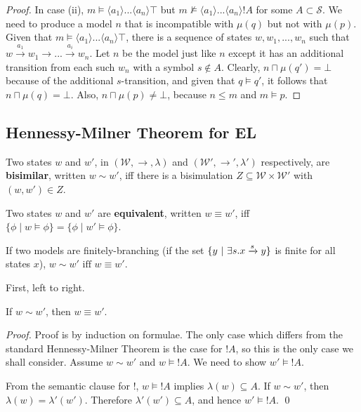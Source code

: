 \begin{proof}
In case (ii), $m \models \langle a_1 \rangle ... \langle a_n \rangle \top$ but $m \nvDash \langle a_1 \rangle ... \langle a_n \rangle !A$ for some $A \subset \mathcal{S}$. We need to produce a model $n$ that is incompatible with $\mu(q)$ but not with $\mu(p)$. Given that $m \models \langle a_1 \rangle ... \langle a_n \rangle \top$, there is a sequence of states $w, w_1, ..., w_n$ such that $w \xrightarrow{a_1} w_1 \rightarrow ... \xrightarrow{a_i} w_n$. Let $n$ be the model just like $n$ except it has an additional transition from each such $w_n$ with a symbol $s \notin A$. Clearly, $n \sqcap \mu(q') = \bot$ because of the additional $s$-transition, and given that $q \models q'$, it follows that $n \sqcap \mu(q) = \bot$. Also, $n \sqcap \mu(p) \neq \bot$, because $n \leq m$ and $m \models p$.


\end{proof}

\subsection{Hennessy-Milner Theorem for EL}

\begin{definition}
Two states $w$ and $w'$, in $(\mathcal{W}, \rightarrow, \lambda)$ and $(\mathcal{W}', \rightarrow', \lambda')$ respectively, are {\bf bisimilar}, written $w \sim w'$, iff there is a bisimulation $Z \subseteq  \mathcal{W} \times \mathcal{W}'$ with $(w,w') \in Z$.
\end{definition}

\begin{definition}
Two states $w$ and $w'$ are {\bf equivalent}, written $w \equiv w'$, iff $\{\phi \; | \; w \models \phi\} = \{\phi \; | \; w' \models \phi\}$.
\end{definition}
\begin{theorem}
If two models are finitely-branching (if the set $\{y \ | \  \exists s . x \xrightarrow{s} y\}$ is finite for all states $x$), $w \sim w' \mbox{ iff } w \equiv w' $.
\end{theorem}
First, left to right.
\begin{case}
If $w \sim w'$, then $w \equiv w'$.
\end{case}
\begin{proof}
Proof is by induction on formulae.
The only case which differs from the standard Hennessy-Milner Theorem is the case for $!A$, so this is the only case we shall consider.
Assume $w \sim w'$ and $w \models !A$. We need to show $w' \models !A$.

From the semantic clause for $!$,  $w \models !A$ implies $\lambda(w) \subseteq A$.
If $w \sim w'$, then $\lambda(w) = \lambda'(w')$.
Therefore $\lambda'(w') \subseteq A$, and hence $w' \models !A$.
\qed
\end{proof}

